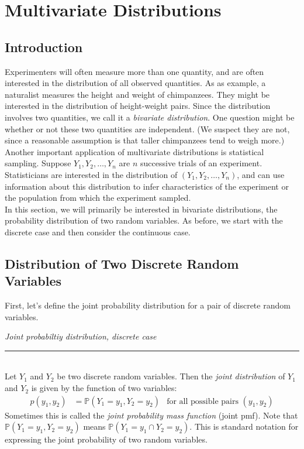 \documentclass[12pt]{article}
\theoremstyle{definition}
\theoremstyle{remark}
\def\P{{\mathbb P}}
\begin{document}
\setcounter{section}{3}
\section{Multivariate Distributions}

\subsection{Introduction}
Experimenters will often measure more than one quantity, and are often interested in the distribution of all observed quantities. As as example, a naturalist measures the height and weight of chimpanzees. They might be interested in the distribution of height-weight pairs. Since the distribution involves two quantities, we call it a \emph{bivariate distribution}. One question might be whether or not these two quantities are independent. (We suspect they are not, since a reasonable assumption is that taller chimpanzees tend to weigh more.)\\

Another important application of multivariate distributions is statistical sampling. Suppose $Y_1, Y_2, \dots, Y_n$ are $n$ successive trials of an experiment. Statisticians are interested in the distribution of $(Y_1, Y_2, \dots, Y_n)$, and can use information about this distribution to infer characteristics of the experiment or the population from which the experiment sampled.\\

In this section, we will primarily be interested in bivariate distributions, the probability distribution of two random variables. As before, we start with the discrete case and then consider the continuous case.

\subsection{Distribution of Two Discrete Random Variables}
First, let's define the joint probability distribution for a pair of discrete random variables.

\begin{framed}
\emph{Joint probabiltiy distribution, discrete case}\\
  \rule{\dimexpr{}\fboxrule}{.1pt} \\
Let $Y_1$ and $Y_2$ be two discrete random variables. Then the \emph{joint distribution} of $Y_1$ and $Y_2$ is given by the function of two variables:
\begin{align*}
p(y_1, y_2) &= \P(Y_1 = y_1, Y_2 = y_2) & \text{for all possible pairs }(y_1, y_2)
\end{align*}
Sometimes this is called the \emph{joint probability mass function} (joint pmf). Note that $\P(Y_1 = y_1, Y_2 = y_2)$ means $\P(Y_1 = y_1 \cap Y_2 = y_2)$. This is standard notation for expressing the joint probability of two random variables. 
\end{framed}
\end{document}
